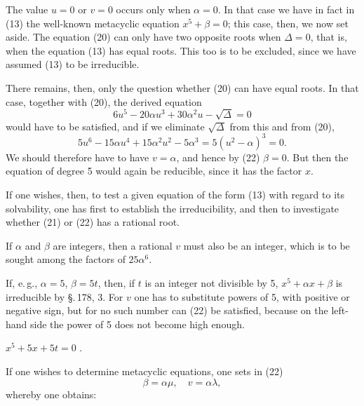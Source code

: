 
The value $u=0$ or $v=0$ occurs only when
$\alpha=0$. In that case we have in fact in (13) the well-known
metacyclic equation $x^5+\beta=0$; this case, then, we
now set aside. The equation (20) can only have
two opposite roots when $\Delta=0$, that is,
when the equation (13) has equal roots. This too is
to be excluded, since we have assumed (13) to be irreducible.

There remains, then, only the question whether (20) can have
equal roots. In that case, together with (20), the derived
equation
\[
6u^5-20\alpha u^3+30\alpha^2u-\sqrt{\Delta}=0
\]
would have to be satisfied, and if we eliminate $\sqrt{\Delta}$ from this
and from (20),
\[
5u^6-15\alpha u^4+15\alpha^2u^2-5\alpha^3=5(u^2-\alpha)^3=0.
\]
We should therefore have to have $v=\alpha$, and hence by (22) $\beta=0$.
But then the equation of degree 5 would again be reducible, since
it has the factor $x$.

If one wishes, then, to test a given equation of the form (13)
with regard to its solvability, one has first to establish the
irreducibility, and then to investigate whether (21)
or (22) has a rational root.

If $\alpha$ and $\beta$ are integers, then a rational $v$ must also
be an integer, which is to be sought among the factors
of $25\alpha^6$.

If, e.\,g., $\alpha=5$, $\beta=5t$, then, if $t$ is an integer not
divisible by 5, $x^5+\alpha x+\beta$ is irreducible by \S.\,178, 3.
For $v$ one has to substitute powers of 5, with positive or
negative sign, but for no such number
can (22) be satisfied, because on the left-hand side the power of
5 does not become high enough.

$x^5+5x+5t=0$ .

If one wishes to determine metacyclic equations, one sets
in (22)
\[
\beta=\alpha\mu,\quad v=\alpha\lambda,
\]
whereby one obtains:
